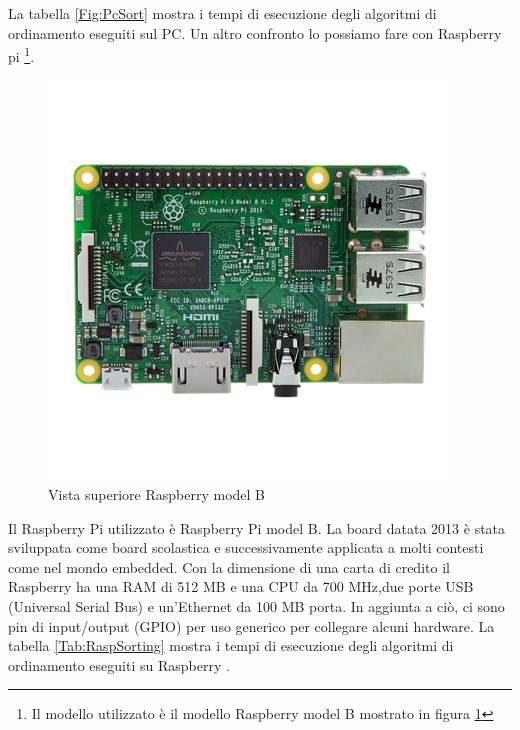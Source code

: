 \documentclass[12pt,a4paper]{report}
\begin{document}
La tabella \ref{Fig:PcSort} mostra i tempi di esecuzione degli algoritmi di ordinamento eseguiti sul PC. 
Un altro confronto lo possiamo fare con Raspberry pi \footnote{Il modello utilizzato è il modello Raspberry model B mostrato in figura \ref{fig:RaspberryB} }.

\begin{figure}[ht]
\centering
	\includegraphics[scale=0.5 ]{RBTop.jpeg}
	\caption{Vista superiore Raspberry model B}
	\label{fig:RaspberryB}
\end{figure}

Il Raspberry Pi utilizzato è Raspberry Pi model B. La board datata 2013 è stata sviluppata come board scolastica e successivamente applicata a molti contesti come nel mondo embedded.
Con la dimensione di una carta di credito il Raspberry ha una RAM di 512 MB e una CPU da 700 MHz,due porte USB (Universal Serial Bus) e un'Ethernet da 100 MB porta. In aggiunta a ciò, ci sono pin di input/output (GPIO) per uso generico per collegare alcuni hardware.  La tabella \ref{Tab:RaspSorting} mostra i tempi di esecuzione degli algoritmi di ordinamento eseguiti su Raspberry \cite{Rasp}.
\end{document}
